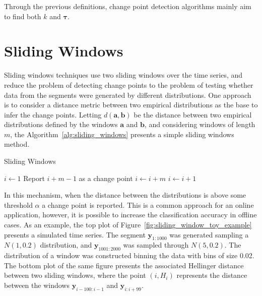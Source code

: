 Through the previous definitions, change point detection algorithms mainly aim to find both $k$ and $\boldsymbol \tau$.

\section{Sliding Windows}

Sliding windows techniques use two sliding windows over the time series, and reduce the problem of detecting change points to the problem of testing whether data from the segments were generated by different distributions. One approach is to consider a distance metric between two empirical distributions as the base to infer the change points. Letting $d(\mathbf{a}, \mathbf{b})$ be the distance between two empirical distributions defined by the windows $\mathbf{a}$ and $\mathbf{b}$, and considering windows of length $m$, the Algorithm~\ref{alg:sliding_windows} presents a simple sliding windows method.

\begin{algorithm}
    \caption{Sliding Windows}
    \label{alg:sliding_windows}
	\begin{algorithmic}[1]
		\State $i \gets 1$
                \State Report $i + m - 1$ as a change point
		        \State $i \gets i + m$
             \Else
		        \State $i \gets i + 1$
             \EndIf
        \EndWhile
	\end{algorithmic}
\end{algorithm}

In this mechanism, when the distance between the distributions is above some threshold $\alpha$ a change point is reported. This is a common approach for an online application, however, it is possible to increase the classification accuracy in offline cases. As an example, the top plot of Figure~\ref{fig:sliding_window_toy_example} presents a simulated time series. The segment $\mathbf{y}_{1 : 1000}$ was generated sampling a $N(1, 0.2)$ distribution, and $\mathbf{y}_{1001 : 2000}$ was sampled through $N(5, 0.2)$. The distribution of a window was constructed binning the data with bins of size 0.02. The bottom plot of the same figure presents the associated Hellinger distance~\cite{hellinger_distance} between two sliding windows, where the point $(i, H_{i})$ represents the distance between the windows $\mathbf{y}_{i - 100 : i - 1}$ and $\mathbf{y}_{i : i + 99}$.

